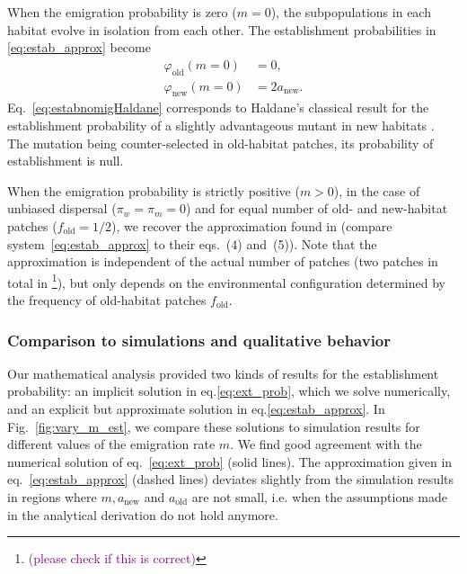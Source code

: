 \documentclass[11pt]{article}
\newcommand{\florence}[1]{\textcolor{purple}{(#1)}} %
\begin{document}
When the emigration probability is zero ($m=0$), the subpopulations in each habitat evolve in isolation from each other. The establishment probabilities in \eqref{eq:estab_approx} become
%
\begin{subequations}\label{eq:estabnomig}
	\begin{align}
	\varphi_{\text{old}} (m=0) &= 0, \\
	\varphi_{\text{new}} (m=0) &  = 2 a_{\text{new}}. \label{eq:estabnomigHaldane}
	\end{align}
\end{subequations}
Eq.~\eqref{eq:estabnomigHaldane} corresponds to Haldane's classical result for the establishment probability of a slightly advantageous mutant in new habitats \citep{haldane_1927}.  The mutation being counter-selected in old-habitat patches, its probability of establishment is null. 

When the emigration probability is strictly positive ($m>0$), in the case of unbiased dispersal ($\pi_w=\pi_m=0$) and for equal number of old- and new-habitat patches ($f_{\text{old}}=1/2$), we recover the approximation found in \cite{tomasini_2018} (compare system~\eqref{eq:estab_approx} to their eqs.~(4) and~(5)). Note that the approximation is independent of the actual number of patches (two patches in total in \cite{tomasini_2018} \footnote{\florence{please check if this is correct}}), but only depends on the environmental configuration determined by the frequency of old-habitat patches $f_{\text{old}}$.

\subsubsection*{Comparison to simulations and qualitative behavior}
Our mathematical analysis provided two kinds of results for the establishment probability: an implicit solution in eq.\eqref{eq:ext_prob}, which we solve numerically, and an explicit but approximate solution in eq.\eqref{eq:estab_approx}. In Fig.~\ref{fig:vary_m_est}, we compare these solutions to simulation results for different values of the emigration rate $m$. We find good agreement with the numerical solution of eq.~\eqref{eq:ext_prob} (solid lines). The approximation given in eq.~\eqref{eq:estab_approx} (dashed lines) deviates slightly from the simulation results in regions where $m,a_{\text{new}}$ and $a_{\text{old}}$ are not small, i.e. when the assumptions made in the analytical derivation do not hold anymore. 
\end{document}
